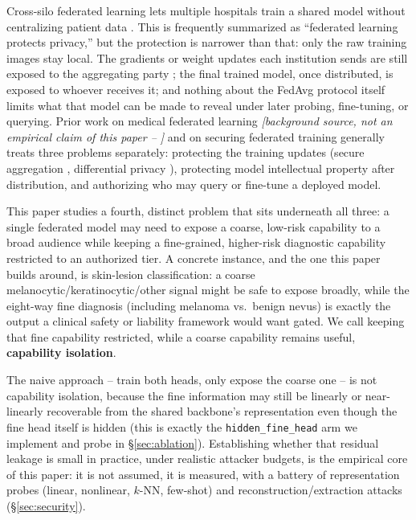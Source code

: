 \documentclass[11pt]{article}
\newcommand{\status}[1]{\textit{[#1]}}
\begin{document}
Cross-silo federated learning lets multiple hospitals train a shared model
without centralizing patient data \citep{mcmahan2017fedavg}. This is
frequently summarized as ``federated learning protects privacy,'' but the
protection is narrower than that: only the raw training images stay local.
The gradients or weight updates each institution sends are still exposed to
the aggregating party \citep{zhu2019deep}; the final trained model, once
distributed, is exposed to whoever receives it; and nothing about the FedAvg
protocol itself limits what that model can be made to reveal under later
probing, fine-tuning, or querying. Prior work on medical federated learning
\status{background source, not an empirical claim of this paper --
\citet{duterrail2022flamby}} and on securing federated training generally
treats three problems separately: protecting the training updates (secure
aggregation \citep{bonawitz2017secagg}, differential privacy
\citep{abadi2016deep}), protecting model intellectual property after
distribution, and authorizing who may query or fine-tune a deployed model.

This paper studies a fourth, distinct problem that sits underneath all three:
a single federated model may need to expose a coarse, low-risk capability to
a broad audience while keeping a fine-grained, higher-risk diagnostic
capability restricted to an authorized tier. A concrete instance, and the one
this paper builds around, is skin-lesion classification: a coarse
melanocytic/keratinocytic/other signal might be safe to expose broadly, while
the eight-way fine diagnosis (including melanoma vs.\ benign nevus) is exactly
the output a clinical safety or liability framework would want gated. We call
keeping that fine capability restricted, while a coarse capability remains
useful, \textbf{capability isolation}.

The naive approach -- train both heads, only expose the coarse one -- is not
capability isolation, because the fine information may still be linearly or
near-linearly recoverable from the shared backbone's representation even
though the fine head itself is hidden (this is exactly the
\texttt{hidden\_fine\_head} arm we implement and probe in
\S\ref{sec:ablation}). Establishing whether that residual leakage is small in
practice, under realistic attacker budgets, is the empirical core of this
paper: it is not assumed, it is measured, with a battery of representation
probes (linear, nonlinear, $k$-NN, few-shot) and reconstruction/extraction
attacks (\S\ref{sec:security}).
\end{document}
